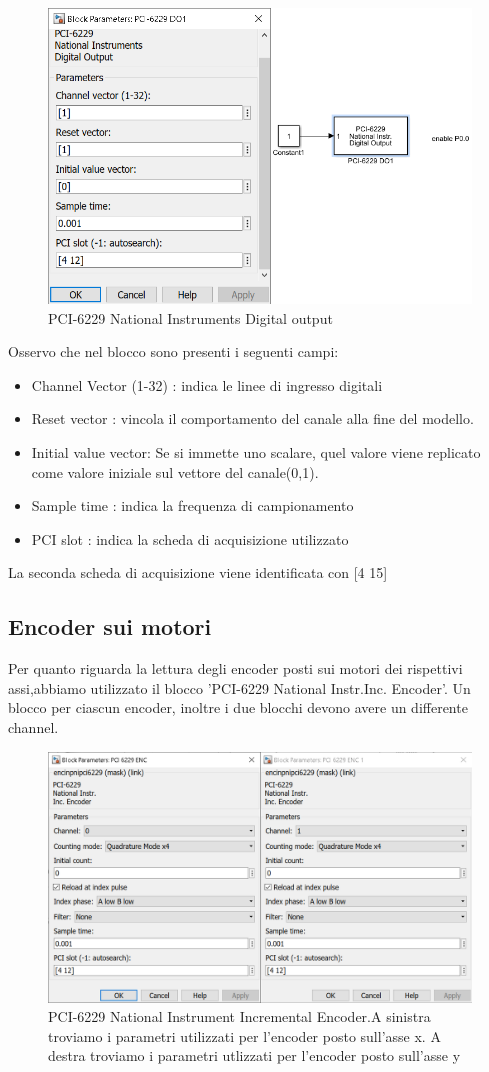 \documentclass{article}
\begin{document}
\begin{figure}[H]
\centering
\includegraphics[width=.6\textwidth]{./simulink_real/digitaloutput.png}
\caption{PCI-6229 National Instruments Digital output}
\end{figure}
Osservo che nel blocco sono presenti i seguenti campi:
\begin{itemize}
    \item  Channel Vector (1-32) : indica le linee di ingresso digitali
    \item Reset vector : vincola il comportamento del canale alla fine del modello.
    \item Initial value vector: Se si immette uno scalare, quel valore viene replicato come valore iniziale sul vettore del canale(0,1).
    \item  Sample time : indica la frequenza di campionamento
    \item PCI slot : indica la scheda di acquisizione utilizzato
\end{itemize}
La seconda scheda di acquisizione viene identificata con [4 15]

\subsection{Encoder sui motori}
Per quanto riguarda la lettura degli encoder posti sui motori dei rispettivi assi,abbiamo utilizzato il blocco 'PCI-6229 National Instr.Inc. Encoder'. Un blocco per ciascun encoder, inoltre i due blocchi devono avere un differente channel.
\begin{figure}[H]
\centering
\includegraphics[width=.6\textwidth]{./simulink_real/pencoderxy.png}
\caption{PCI-6229 National Instrument Incremental Encoder.A sinistra troviamo i parametri utilizzati per l'encoder posto sull'asse x. A destra troviamo i parametri utlizzati per l'encoder posto sull'asse y}
\end{figure}
\end{document}
